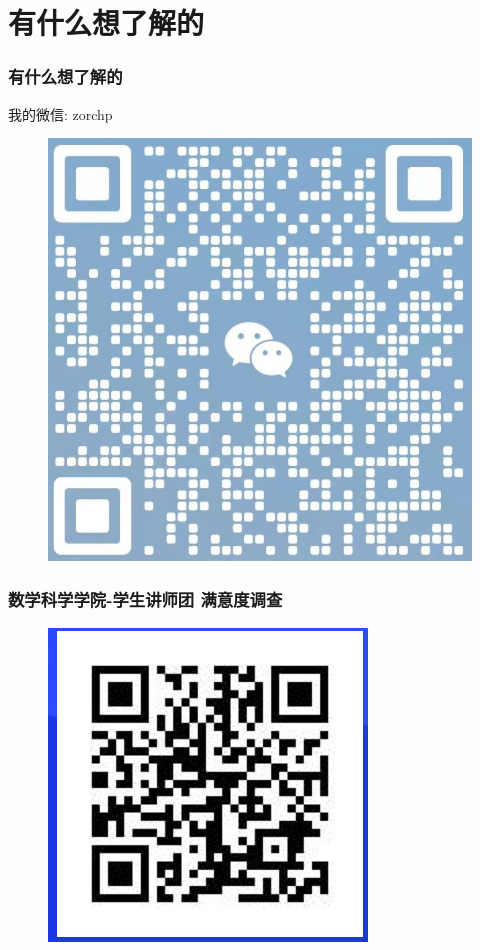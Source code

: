 \documentclass{ctexbeamer}
\begin{document}



\section{有什么想了解的}

\begin{frame}
	\frametitle{有什么想了解的}

	我的微信: zorchp
	\begin{figure}\centering
		\includegraphics[width=.5\textwidth]{figures/my.jpg}
	\end{figure}
\end{frame}

\begin{frame}
	\frametitle{数学科学学院-学生讲师团 满意度调查}

	\begin{figure}
		\centering
		\includegraphics[width=.6\textwidth]{figures/survey.png}
	\end{figure}

\end{frame}

\begin{frame}{}
	\begin{center}
	\end{center}
\end{frame}
\end{document}
